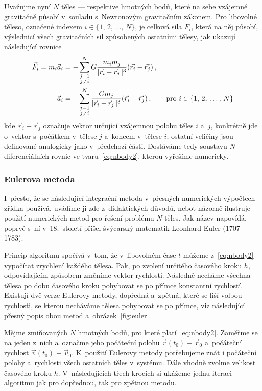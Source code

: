 \documentclass[A4paper, 12pt, oneside]{book}
\begin{document}
Uvažujme nyní $N$ těles --- respektive hmotných bodů, které na sebe vzájemně gravitačně působí v~souladu s~Newtonovým gravitačním zákonem. Pro libovolné těleso, označené indexem $i\in\{1,\,2,\,\dots,\,N\}$, je celková síla $F_i$, která na něj působí, výslednicí všech gravitačních sil způsobených ostatními tělesy, jak ukazují následující rovnice
\begin{align} 
	\vec{F}_i = m_i\vec{a}_i &= -\sum_{\substack{j=1 \\ j\neq i}}^N G\frac{m_im_j}{\lvert \vec{r}_i-\vec{r}_j \,\rvert^3}(\vec{r_i}-\vec{r_j})\,, \label{eq:nbody1} \\
		\vec{a}_i &= -\sum_{\substack{j=1 \\ j\neq i}}^N \frac{Gm_j}{\lvert \vec{r}_i-\vec{r}_j \,\rvert^3}(\vec{r_i}-\vec{r_j})\,, \qquad{\rm pro}\ i\in\{1,\,2,\,\dots,\,N\} \label{eq:nbody2}
\end{align}
kde $\vec{r}_i-\vec{r}_j$ označuje vektor určující vzájemnou polohu těles $i$ a~$j$, konkrétně jde o~vektor s~počátkem v~tělese $j$ a~koncem v~tělese $i$; ostatní veličiny jsou definované analogicky jako v~předchozí části. Dostáváme tedy soustavu $N$ diferenciálních rovnic ve tvaru~\eqref{eq:nbody2}, kterou vyřešíme numericky.
\subsubsection{Eulerova metoda}\label{sec:euler}
I~přesto, že se následující integrační metoda v~přesných numerických výpočtech zřídka používá, uvádíme ji zde z~didaktických důvodů, neboť názorně ilustruje použití numerických metod pro řešení problému $N$ těles. Jak název napovídá, poprvé s~ní v~18.\ století přišel švýcarský matematik Leonhard Euler (1707--1783).

Princip algoritmu spočívá v~tom, že v~libovolném čase $t$ můžeme z~\eqref{eq:nbody2} vypočítat zrychlení každého tělesa. Pak, po zvolení určitého časového kroku $h$, odpovídajícím způsobem změníme vektor rychlosti. Následně necháme všechna tělesa po dobu časového kroku pohybovat se po přímce konstantní rychlostí. Existují dvě verze Eulerovy metody, dopředná a~zpětná, které se liší volbou rychlosti, se kterou necháváme tělesa pohybovat se po přímce, viz následující přesný popis obou metod a~obrázek~\ref{fig:euler}.

Mějme zmiňovaných $N$ hmotných bodů, pro které platí~\eqref{eq:nbody2}. Zaměřme se na jeden z~nich a~označme jeho počáteční polohu $\vec{r}(t_0)\equiv\vec{r}_0$ a~počáteční rychlost $\vec{v}(t_0)\equiv\vec{v}_0$. K~použití Eulerovy metody potřebujeme znát i počáteční polohy a~rychlosti všech ostatních těles v~systému. Dále vhodně zvolme velikost časového kroku $h$. V~následujících třech krocích si ukážeme jednu iteraci algoritmu jak pro dopřednou, tak pro zpětnou metodu.
\end{document}

